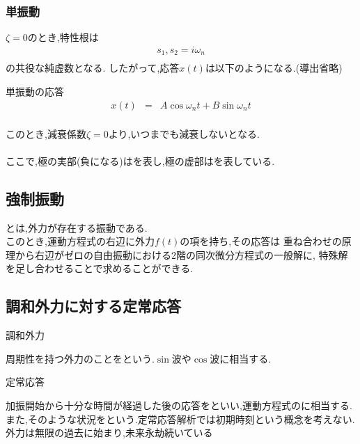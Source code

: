 \documentclass[a4paper]{jsarticle}
\begin{document}
\subsubsection{単振動}
$\zeta = 0$のとき,特性根は
\begin{eqnarray*}
    s_1,s_2=i\omega_n\\
\end{eqnarray*}
の共役な純虚数となる.
したがって,応答$x\left(t\right)$は以下のようになる.(導出省略)
\begin{itembox}[l]{単振動の応答}
    \begin{eqnarray*}
        x\left(t\right)&=&A\cos{\omega_nt}+B\sin{\omega_nt}\\
    \end{eqnarray*}
\end{itembox}
このとき,減衰係数$\zeta=0$より,いつまでも減衰しないとなる.\\
\\
ここで,極の実部(負になる)はを表し,極の虚部はを表している.
\subsection{強制振動}
とは,外力が存在する振動である.\\
このとき,運動方程式の右辺に外力$f\left(t\right)$の項を持ち,その応答は
重ね合わせの原理から右辺がゼロの自由振動における2階の同次微分方程式の一般解に,
特殊解を足し合わせることで求めることができる.\\
\subsection{調和外力に対する定常応答}
\begin{itembox}[l]{調和外力}
    \begin{center}
        周期性を持つ外力のことをという.$\sin$波や$\cos$波に相当する.
    \end{center}
\end{itembox}
\begin{itembox}[l]{定常応答}
    \begin{center}
        加振開始から十分な時間が経過した後の応答をといい,運動方程式のに相当する.\\
        また,そのような状況をという.定常応答解析では初期時刻という概念を考えない.\\
        外力は無限の過去に始まり,未来永劫続いている
    \end{center}
\end{itembox}
\end{document}
